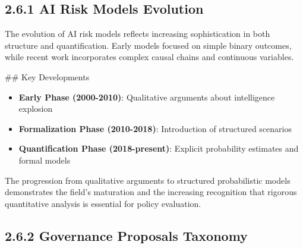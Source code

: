 \documentclass[
  11pt,
  letterpaper,
]{book}
\providecommand{\tightlist}{%
  \setlength{\itemsep}{0pt}\setlength{\parskip}{0pt}}
\begin{document}
\subsection*{2.6.1 AI Risk Models
Evolution}\label{sec-risk-models-evolution}

The evolution of AI risk models reflects increasing sophistication in
both structure and quantification. Early models focused on simple binary
outcomes, while recent work incorporates complex causal chains and
continuous variables.

\begin{tcolorbox}[enhanced jigsaw, arc=.35mm, titlerule=0mm, breakable, toprule=.15mm, toptitle=1mm, colframe=quarto-callout-note-color-frame, coltitle=black, bottomrule=.15mm, bottomtitle=1mm, opacityback=0, title=\textcolor{quarto-callout-note-color}{\faInfo}\hspace{0.5em}{Note}, rightrule=.15mm, leftrule=.75mm, colback=white, colbacktitle=quarto-callout-note-color!10!white, opacitybacktitle=0.6, left=2mm]

\#\# Key Developments

\begin{itemize}
\tightlist
\item
  \textbf{Early Phase (2000-2010)}: Qualitative arguments about
  intelligence explosion
\item
  \textbf{Formalization Phase (2010-2018)}: Introduction of structured
  scenarios
\item
  \textbf{Quantification Phase (2018-present)}: Explicit probability
  estimates and formal models
\end{itemize}

\end{tcolorbox}

\textcite{yudkowsky2008}

\textcite{bostrom2014}

\textcite{amodei2016}

The progression from qualitative arguments to structured probabilistic
models demonstrates the field's maturation and the increasing
recognition that rigorous quantitative analysis is essential for policy
evaluation.

\subsection*{2.6.2 Governance Proposals
Taxonomy}\label{sec-governance-taxonomy}
\end{document}
